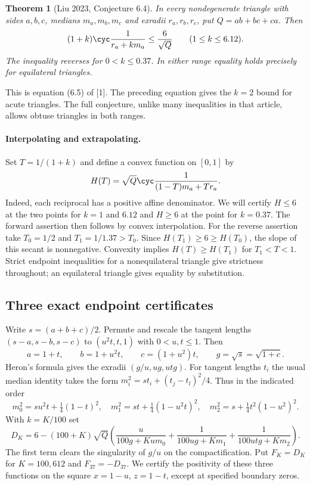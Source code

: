\documentclass[11pt,a4paper]{article}
\numberwithin{equation}{section}
\newtheorem{theorem}{Theorem}[section]
\theoremstyle{definition}
\theoremstyle{remark}
\begin{document}
\begin{theorem}[Liu 2023, Conjecture 6.4]
In every nondegenerate triangle with sides $a,b,c$, medians $m_a,m_b,m_c$ and exradii $r_a,r_b,r_c$, put $Q=ab+bc+ca$. Then
\[
          (1+k)\cyc\frac{1}{r_a+km_a}\le\frac{6}{\sqrt Q}
          \qquad(1\le k\le 6.12).
\]
The inequality reverses for $0<k\le0.37$. In either range equality holds precisely for equilateral triangles.
\end{theorem}
This is equation (6.5) of [1]. The preceding equation gives the $k=2$ bound for acute triangles. The full conjecture, unlike many inequalities in that article, allows obtuse triangles in both ranges.

\paragraph{Interpolating and extrapolating.}
Set $T=1/(1+k)$ and define a convex function on $[0,1]$ by
\[
       H(T)=\sqrt Q\cyc\frac{1}{(1-T)m_a+Tr_a}.
\]
Indeed, each reciprocal has a positive affine denominator. We will certify $H\le6$ at the two points for $k=1$ and $6.12$ and $H\ge6$ at the point for $k=0.37$. The forward assertion then follows by convex interpolation. For the reverse assertion take $T_0=1/2$ and $T_1=1/1.37>T_0$. Since $H(T_1)\ge6\ge H(T_0)$, the slope of this secant is nonnegative. Convexity implies $H(T)\ge H(T_1)$ for $T_1<T<1$. Strict endpoint inequalities for a nonequilateral triangle give strictness throughout; an equilateral triangle gives equality by substitution.


\subsection*{Three exact endpoint certificates}
Write $s=(a+b+c)/2$. Permute and rescale the tangent lengths $(s-a,s-b,s-c)$ to $(u^2t,t,1)$ with $0<u,t\le1$. Then
\[
   a=1+t,\qquad b=1+u^2t,\qquad c=(1+u^2)t,\qquad g=\sqrt{s}=\sqrt{1+c}.
\]
Heron's formula gives the exradii $(g/u,ug,utg)$. For tangent lengths $t_i$ the usual median identity takes the form $m_i^2=st_i+(t_j-t_l)^2/4$. Thus in the indicated order
\[
 m_0^2=su^2t+\tfrac14(1-t)^2,\quad
 m_1^2=st+\tfrac14(1-u^2t)^2,\quad m_2^2=s+\tfrac14t^2(1-u^2)^2.
\]
With $k=K/100$ set
\[
 D_K=6-(100+K)\sqrt Q\left(
 \frac{u}{100g+Kum_0}+\frac1{100ug+Km_1}
                  +\frac1{100utg+Km_2}\right).
\]
The first term clears the singularity of $g/u$ on the compactification. Put $F_K=D_K$ for $K=100,612$ and $F_{37}=-D_{37}$. We certify the positivity of these three functions on the square $x=1-u$, $z=1-t$, except at specified boundary zeros.
\end{document}
